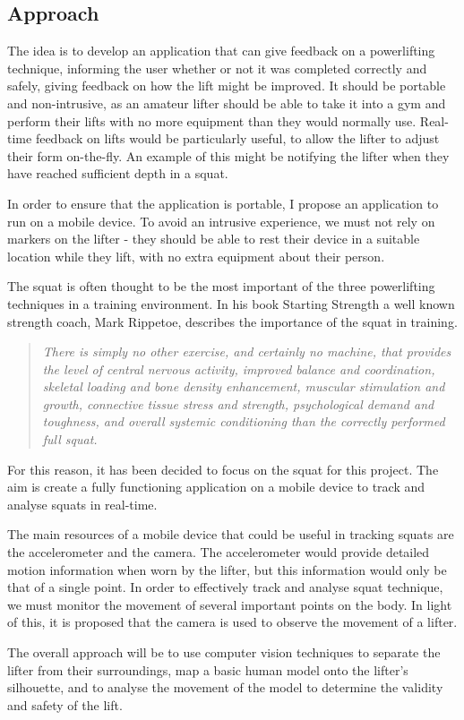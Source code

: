 \subsection{Approach}

The idea is to develop an application that can give feedback on a powerlifting technique, informing the user whether or not it was completed correctly and safely, giving feedback on how the lift might be improved. It should be portable and non-intrusive, as an amateur lifter should be able to take it into a gym and perform their lifts with no more equipment than they would normally use. Real-time feedback on lifts would be particularly useful, to allow the lifter to adjust their form on-the-fly. An example of this might be notifying the lifter when they have reached sufficient depth in a squat.

In order to ensure that the application is portable, I propose an application to run on a mobile device. To avoid an intrusive experience, we must not rely on markers on the lifter - they should be able to rest their device in a suitable location while they lift, with no extra equipment about their person.

The squat is often thought to be the most important of the three powerlifting techniques in a training environment. In his book Starting Strength\cite{startingstrength} a well known strength coach, Mark Rippetoe, describes the importance of the squat in training.

\begin{quote}
\emph{There is simply no other exercise, and certainly no machine, that provides the level of central nervous activity, improved balance and coordination, skeletal loading and bone density enhancement, muscular stimulation and growth, connective tissue stress and strength, psychological demand and toughness, and overall systemic conditioning than the correctly performed full squat.}
\end{quote}

For this reason, it has been decided to focus on the squat for this project. The aim is create a fully functioning application on a mobile device to track and analyse squats in real-time.

The main resources of a mobile device that could be useful in tracking squats are the accelerometer and the camera. The accelerometer would provide detailed motion information when worn by the lifter, but this information would only be that of a single point. In order to effectively track and analyse squat technique, we must monitor the movement of several important points on the body. In light of this, it is proposed that the camera is used to observe the movement of a lifter.

The overall approach will be to use computer vision techniques to separate the lifter from their surroundings, map a basic human model onto the lifter's silhouette, and to analyse the movement of the model to determine the validity and safety of the lift.
